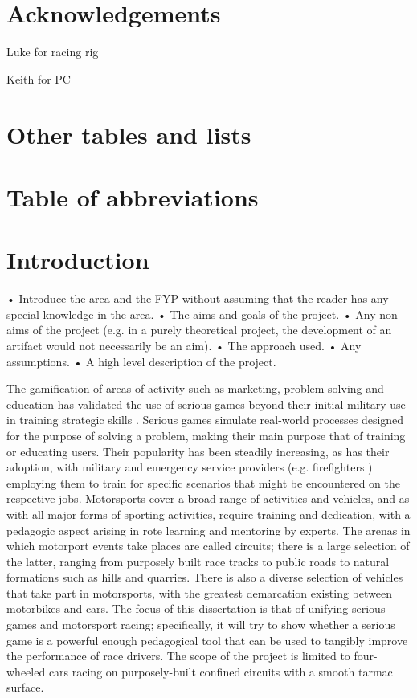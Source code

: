 \documentclass{article}
\begin{document}
\newpage
\section{Acknowledgements}

Luke for racing rig

Keith for PC

\newpage
\tableofcontents

\newpage
\section{Other tables and lists}

\newpage
\section{Table of abbreviations}

\newpage
\section{Introduction}

• Introduce the area and the FYP without assuming that the reader has any special knowledge in the area.
• The aims and goals of the project.
• Any non-aims of the project (e.g. in a purely theoretical project, the development of an artifact would not necessarily be an aim).
• The approach used.
• Any assumptions.
• A high level description of the project.

The gamification of areas of activity such as marketing, problem solving and education \cite{michael2005serious} has validated the use of serious games beyond their initial military use in training strategic skills \cite{djaouti2011classifying}.  Serious games simulate real-world processes designed for the purpose of solving a problem, making their main purpose that of training or educating users. Their popularity has been steadily increasing, as has their adoption, with military \cite{djaouti2011classifying} and emergency service providers (e.g. firefighters \cite{michael2005serious}) employing them to train for specific scenarios that might be encountered on the respective jobs. Motorsports cover a broad range of activities and vehicles, and as with all major forms of sporting activities, require training and dedication, with a pedagogic aspect arising in rote learning and mentoring by experts. The arenas in which motorport events take places are called circuits; there is a large selection of the latter, ranging from purposely built race tracks to public roads to natural formations such as hills and quarries. There is also a diverse selection of vehicles that take part in motorsports, with the greatest demarcation existing between motorbikes and cars. The focus of this dissertation is that of unifying serious games and motorsport racing; specifically, it will try to show whether a serious game is a powerful enough pedagogical tool that can be used to tangibly improve the performance of race drivers. The scope of the project is limited to four-wheeled cars racing on purposely-built confined circuits with a smooth tarmac surface.  
\end{document}
